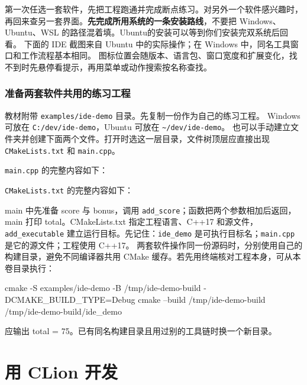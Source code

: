 第一次任选一套软件，先把工程跑通并完成断点练习。对另外一个软件感兴趣时，再回来查另一套界面。\textbf{先完成所用系统的一条安装路线}，不要把 Windows、Ubuntu、WSL 的路径混着填。Ubuntu的安装可以等到你们安装完双系统后回看。
下面的 IDE 截图来自 Ubuntu 中的实际操作；在 Windows 中，同名工具窗口和工作流程基本相同。
图标位置会随版本、语言包、窗口宽度和扩展变化，找不到时先悬停看提示，再用菜单或动作搜索按名称查找。

\subsubsection{准备两套软件共用的练习工程}
教材附带 \texttt{examples/ide-demo} 目录。先复制一份作为自己的练习工程。
Windows 可放在 \texttt{C:/dev/ide-demo}，Ubuntu 可放在 \texttt{\textasciitilde/dev/ide-demo}。
也可以手动建立文件夹并创建下面两个文件。打开时选这一层目录，文件树顶层应直接出现 \texttt{CMakeLists.txt} 和 \texttt{main.cpp}。

\begin{example}[计分器：预期输出 total = 75]
\texttt{main.cpp} 的完整内容如下：





\texttt{CMakeLists.txt} 的完整内容如下：





main 中先准备 score 与 bonus，调用 \texttt{add\_score}；函数把两个参数相加后返回，main 打印 total。CMakeLists.txt 指定工程语言、C++17 和源文件，\texttt{add\_executable} 建立运行目标。先记住：\texttt{ide\_demo} 是可执行目标名；\texttt{main.cpp} 是它的源文件；工程使用 C++17。
两套软件操作同一份源码时，分别使用自己的构建目录，避免不同编译器共用 CMake 缓存。若先用终端核对工程本身，可从本卷目录执行：


\begin{tbash}
cmake -S examples/ide-demo -B /tmp/ide-demo-build -DCMAKE_BUILD_TYPE=Debug
cmake --build /tmp/ide-demo-build
/tmp/ide-demo-build/ide_demo
\end{tbash}


应输出 total = 75。已有同名构建目录且用过别的工具链时换一个新目录。
\end{example}

\section{用 CLion 开发}
\label{sec:ide-clion}
